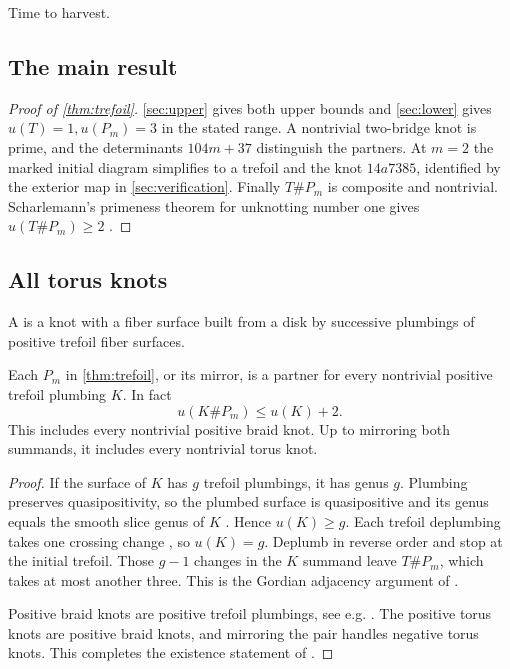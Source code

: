 \documentclass[a4paper,11pt]{amsart}
\let\emph\relax
\numberwithin{equation}{subsection}
\theoremstyle{plain}
\theoremstyle{remark}
\begin{document}
Time to harvest.

\subsection{The main result}

\begin{proof}[Proof of \autoref{thm:trefoil}]
\autoref{sec:upper} gives both upper bounds and \autoref{sec:lower} gives $u(T)=1,u(P_m)=3$ in the stated range. A nontrivial two-bridge knot is prime, and the determinants $104m+37$ distinguish the partners. At $m=2$ the marked initial diagram simplifies to a trefoil and the knot $14a7385$, identified by the exterior map in \autoref{sec:verification}. Finally $T\#P_m$ is composite and nontrivial. Scharlemann's primeness theorem for unknotting number one gives $u(T\#P_m)\geq2$ \cite{Scharlemann}.
\end{proof}

\subsection{All torus knots}

A \emph{positive trefoil plumbing} is a knot with a fiber surface built from a disk by successive plumbings of positive trefoil fiber surfaces.

\begin{Corollary}\label{cor:braids}
Each $P_m$ in \autoref{thm:trefoil}, or its mirror, is a partner for every nontrivial positive trefoil plumbing $K$. In fact
\[
u(K\#P_m)\leq u(K)+2.
\]
This includes every nontrivial positive braid knot. Up to mirroring both summands, it includes every nontrivial torus knot.
\end{Corollary}

\begin{proof}
If the surface of $K$ has $g$ trefoil plumbings, it has genus $g$. Plumbing preserves quasipositivity, so the plumbed surface is quasipositive and its genus equals the smooth slice genus of $K$ \cite[Theorem~4.3 and Lemma~5.2.1]{Rudolph}. Hence $u(K)\geq g$. Each trefoil deplumbing takes one crossing change \cite[Figure~6]{Kegel}, so $u(K)=g$. Deplumb in reverse order and stop at the initial trefoil. Those $g-1$ changes in the $K$ summand leave $T\#P_m$, which takes at most another three. This is the Gordian adjacency argument of \cite[Lemma~4.1]{BH-small}.

Positive braid knots are positive trefoil plumbings, see e.g. \cite[Section~1]{Kegel}. The positive torus knots are positive braid knots, and mirroring the pair handles negative torus knots. This completes the existence statement of \cite[Corollary~4.2]{BH-small}.
\end{proof}
\end{document}
